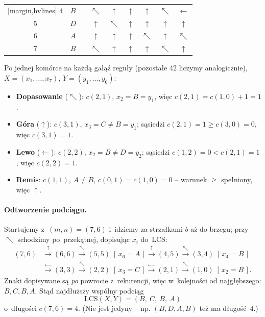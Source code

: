 \begin{aztable}
\begin{minipage}{0.48\linewidth}
\begin{NiceTabular}{cc|c|cccccc}[margin,hvlines]
			4   & $B$   &       & $\nwarrow$ & $\uparrow$   & $\uparrow$   & $\uparrow$   & \color{accentB}$\nwarrow$ & $\leftarrow$ \\
			5   & $D$   &       & $\uparrow$ & $\nwarrow$   & $\uparrow$   & $\uparrow$   & $\uparrow$   & $\uparrow$   \\
			6   & $A$   &       & $\uparrow$ & $\uparrow$   & $\uparrow$   & $\nwarrow$   & $\uparrow$   & \color{accentB}$\nwarrow$ \\
			7   & $B$   &       & $\nwarrow$ & $\uparrow$   & $\uparrow$   & $\uparrow$   & $\nwarrow$   & $\uparrow$   \\
		\end{NiceTabular}
	\end{minipage}
\end{aztable}

\begin{dygresja}
	Po jednej komórce na każdą gałąź reguły (pozostałe $42$ liczymy analogicznie),
	$X = (x_1, \dots, x_7)$, $Y = (y_1, \dots, y_6)$:
	\begin{itemize}
		\item \textbf{Dopasowanie} ($\nwarrow$): $c(2, 1)$, $x_2 = B = y_1$, więc
		      $c(2, 1) = c(1, 0) + 1 = 1$.
		\item \textbf{Góra} ($\uparrow$): $c(3, 1)$, $x_3 = C \neq B = y_1$; sąsiedzi
		      $c(2, 1) = 1 \geq c(3, 0) = 0$, więc $c(3, 1) = 1$.
		\item \textbf{Lewo} ($\leftarrow$): $c(2, 2)$, $x_2 = B \neq D = y_2$; sąsiedzi
		      $c(1, 2) = 0 < c(2, 1) = 1$, więc $c(2, 2) = 1$.
		\item \textbf{Remis}: $c(1, 1)$, $A \neq B$, $c(0, 1) = c(1, 0) = 0$ -- warunek
		      $\geq$ spełniony, więc $\uparrow$.
	\end{itemize}
\end{dygresja}

\paragraph{Odtworzenie podciągu.}
Startujemy z~$(m, n) = (7, 6)$ i~idziemy za strzałkami $b$ aż do brzegu; przy
$\nwarrow$ schodzimy po~przekątnej, dopisując $x_i$ do~LCS:
\[
	\begin{aligned}
		(7, 6) & \xrightarrow{\uparrow} (6, 6) \xrightarrow{\nwarrow} (5, 5) \;[\,x_6 = A\,]
		\xrightarrow{\uparrow} (4, 5) \xrightarrow{\nwarrow} (3, 4) \;[\,x_4 = B\,] \\
		       & \xrightarrow{\leftarrow} (3, 3) \xrightarrow{\nwarrow} (2, 2) \;[\,x_3 = C\,]
		\xrightarrow{\leftarrow} (2, 1) \xrightarrow{\nwarrow} (1, 0) \;[\,x_2 = B\,].
	\end{aligned}
\]
Znaki dopisywane są \emph{po} powrocie z~rekurencji, więc w~kolejności od
najgłębszego: $B, C, B, A$. Stąd najdłuższy wspólny podciąg
\[
	\boxed{\text{LCS}(X, Y) = (B,\ C,\ B,\ A)}
\]
o~długości $c(7, 6) = 4$. (Nie jest jedyny -- np. $(B, D, A, B)$ też ma długość~$4$.)
